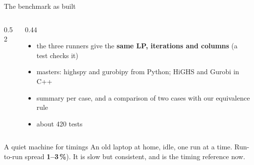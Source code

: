 \documentclass[aspectratio=169]{beamer}
\begin{document}
\begin{frame}{The benchmark as built}
  \begin{columns}[T]
    \begin{column}{0.52\textwidth}
      \centering
    \end{column}
    \begin{column}{0.44\textwidth}
      \begin{itemize}\small
        \item the three runners give the \textbf{same LP, iterations and columns} (a test checks it)
        \item masters: highspy and gurobipy from Python; HiGHS and Gurobi in C++
        \item summary per case, and a comparison of two cases with our equivalence rule
        \item about 420 tests
      \end{itemize}
    \end{column}
  \end{columns}

  \vspace{0.6em}
  \begin{block}{A quiet machine for timings}
    \small An old laptop at home, idle, one run at a time. Run-to-run spread \textbf{1--3\,\%}). It is slow but consistent, and is the timing reference now.
  \end{block}
\end{frame}
\end{document}
